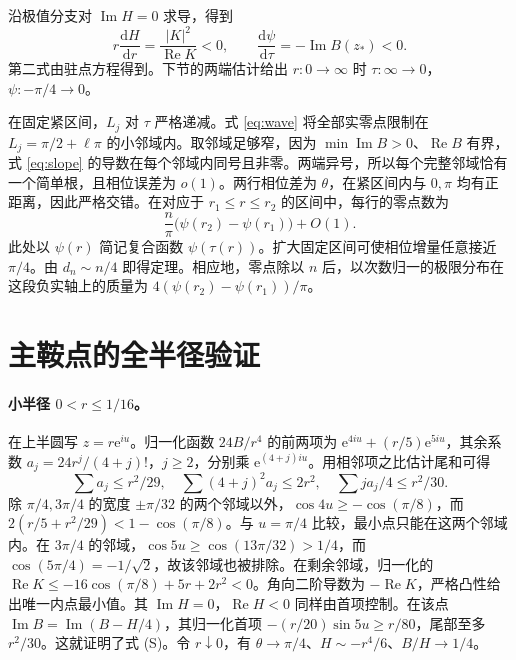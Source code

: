 \documentclass[UTF8,fontset=fandol,11pt,a4paper]{ctexart}
\newcommand{\Rea}{\operatorname{Re}}
\newcommand{\Ima}{\operatorname{Im}}
\newcommand{\expo}{\mathrm e}
\newcommand{\dd}{\mathrm d}
\begin{document}
沿极值分支对 $\Ima H=0$ 求导，得到
\[
 r\frac{\dd H}{\dd r}=\frac{|K|^2}{\Rea K}<0,\qquad
 \frac{\dd\psi}{\dd\tau}=-\Ima B(z_*)<0 .
\]
第二式由驻点方程得到。下节的两端估计给出 $r:0\to\infty$ 时 $\tau:\infty\to0$，$\psi:-\pi/4\to0$。

在固定紧区间，$L_j$ 对 $\tau$ 严格递减。式 \eqref{eq:wave} 将全部实零点限制在 $L_j=\pi/2+\ell\pi$ 的小邻域内。取邻域足够窄，因为 $\min\Ima B>0$、$\Rea B$ 有界，式 \eqref{eq:slope} 的导数在每个邻域内同号且非零。两端异号，所以每个完整邻域恰有一个简单根，且相位误差为 $o(1)$。两行相位差为 $\theta$，在紧区间内与 $0,\pi$ 均有正距离，因此严格交错。在对应于 $r_1\le r\le r_2$ 的区间中，每行的零点数为
\[
 \frac{n}{\pi}\bigl(\psi(r_2)-\psi(r_1)\bigr)+O(1).
\]
此处以 $\psi(r)$ 简记复合函数 $\psi(\tau(r))$。扩大固定区间可使相位增量任意接近 $\pi/4$。由 $d_n\sim n/4$ 即得定理。相应地，零点除以 $n$ 后，以次数归一的极限分布在这段负实轴上的质量为 $4(\psi(r_2)-\psi(r_1))/\pi$。

\section{主鞍点的全半径验证}
\paragraph{小半径 $0<r\le1/16$。}
在上半圆写 $z=r\expo^{iu}$。归一化函数 $24B/r^4$ 的前两项为 $\expo^{4iu}+(r/5)\expo^{5iu}$，其余系数 $a_j=24r^j/(4+j)!$，$j\ge2$，分别乘 $\expo^{(4+j)iu}$。用相邻项之比估计尾和可得
\[
 \sum a_j\le r^2/29,\quad \sum(4+j)^2a_j\le2r^2,\quad
 \sum j a_j/4\le r^2/30 .
\]
除 $\pi/4,3\pi/4$ 的宽度 $\pm\pi/32$ 的两个邻域以外，$\cos 4u\ge-\cos(\pi/8)$，而 $2(r/5+r^2/29)<1-\cos(\pi/8)$。与 $u=\pi/4$ 比较，最小点只能在这两个邻域内。在 $3\pi/4$ 的邻域，$\cos 5u\ge\cos(13\pi/32)>1/4$，而 $\cos(5\pi/4)=-1/\sqrt2$，故该邻域也被排除。在剩余邻域，归一化的 $\Rea K\le-16\cos(\pi/8)+5r+2r^2<0$。角向二阶导数为 $-\Rea K$，严格凸性给出唯一内点最小值。其 $\Ima H=0$，$\Rea H<0$ 同样由首项控制。在该点 $\Ima B=\Ima(B-H/4)$，其归一化首项 $-(r/20)\sin 5u\ge r/80$，尾部至多 $r^2/30$。这就证明了式 (S)。令 $r\downarrow0$，有 $\theta\to\pi/4$、$H\sim-r^4/6$、$B/H\to1/4$。
\end{document}

